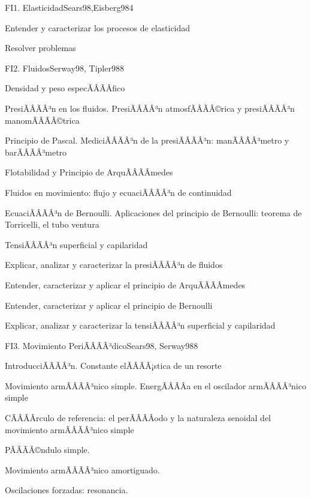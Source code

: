 \begin{sumilla}
\begin{unit}{FI1. Elasticidad}{Sears98,Eisberg98}{4}
   \begin{objetivos}
         \item  Entender y caracterizar los procesos de elasticidad
         \item  Resolver problemas
   \end{objetivos}
\end{unit}

\begin{unit}{FI2. Fluidos}{Serway98, Tipler98}{8}
\begin{topicos}
         \item  Densidad y peso especÃÂÃÂ­fico
	 \item  PresiÃÂÃÂ³n en los fluidos. PresiÃÂÃÂ³n atmosfÃÂÃÂ©rica y presiÃÂÃÂ³n manomÃÂÃÂ©trica
         \item  Principio de Pascal. MediciÃÂÃÂ³n de la presiÃÂÃÂ³n: manÃÂÃÂ³metro y barÃÂÃÂ³metro
	 \item  Flotabilidad y Principio de ArquÃÂÃÂ­medes
         \item  Fluidos en movimiento: flujo y ecuaciÃÂÃÂ³n de continuidad
	 \item  EcuaciÃÂÃÂ³n de Bernoulli. Aplicaciones del principio de Bernoulli: teorema de Torricelli, el tubo ventura
         \item  TensiÃÂÃÂ³n superficial y capilaridad
   \end{topicos}

   \begin{objetivos}
         \item  Explicar, analizar y caracterizar la presiÃÂÃÂ³n de fluidos
         \item  Entender, caracterizar y aplicar el principio de ArquÃÂÃÂ­medes
         \item  Entender, caracterizar y aplicar el principio de Bernoulli
         \item  Explicar, analizar y caracterizar la tensiÃÂÃÂ³n superficial y capilaridad
   \end{objetivos}
\end{unit}

\begin{unit}{FI3. Movimiento PeriÃÂÃÂ³dico}{Sears98, Serway98}{8}
\begin{topicos}
         \item  IntroducciÃÂÃÂ³n. Constante elÃÂÃÂ¡stica de un resorte
	 \item  Movimiento armÃÂÃÂ³nico simple. EnergÃÂÃÂ­a en el oscilador armÃÂÃÂ³nico simple
         \item  CÃÂÃÂ­rculo de referencia: el perÃÂÃÂ­odo y la naturaleza senoidal del movimiento armÃÂÃÂ³nico simple
	 \item  PÃÂÃÂ©ndulo simple.
         \item  Movimiento armÃÂÃÂ³nico amortiguado.
         \item  Oscilaciones forzadas: resonancia.
   \end{topicos}


\end{unit}
\end{sumilla}
